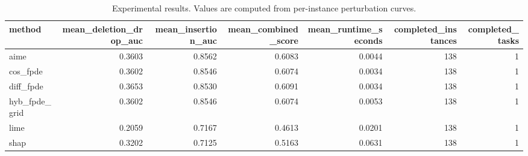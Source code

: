 \begin{table}[t]
\caption{Experimental results. Values are computed from per-instance perturbation curves.}
\label{tab:main_results_computed}
\centering
\begin{tabular}{lrrrrrr}
\toprule
method & mean\_deletion\_drop\_auc & mean\_insertion\_auc & mean\_combined\_score & mean\_runtime\_seconds & completed\_instances & completed\_tasks \\
\midrule
aime & 0.3603 & 0.8562 & 0.6083 & 0.0044 & 138 & 1 \\
cos\_fpde & 0.3602 & 0.8546 & 0.6074 & 0.0034 & 138 & 1 \\
diff\_fpde & 0.3653 & 0.8530 & 0.6091 & 0.0034 & 138 & 1 \\
hyb\_fpde\_grid & 0.3602 & 0.8546 & 0.6074 & 0.0053 & 138 & 1 \\
lime & 0.2059 & 0.7167 & 0.4613 & 0.0201 & 138 & 1 \\
shap & 0.3202 & 0.7125 & 0.5163 & 0.0631 & 138 & 1 \\
\bottomrule
\end{tabular}

\end{table}
